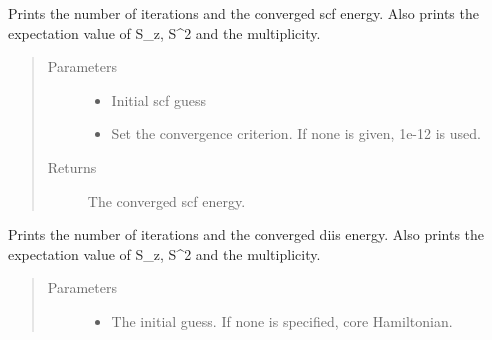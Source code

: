 \documentclass[letterpaper,10pt,english]{sphinxmanual}
\begin{document}
\begin{fulllineitems}
\begin{fulllineitems}
\begin{quote}
\begin{description}
\end{description}\end{quote}

\end{fulllineitems}


\begin{fulllineitems}
\label{\detokenize{cUHF_b:hf.HartreeFock.cUHF_b.MF.get_scf_solution}}
Prints the number of iterations and the converged scf energy.
Also prints the expectation value of S\_z, S\textasciicircum{}2 and the multiplicity.
\begin{quote}\begin{description}
\item[{Parameters}] \leavevmode\begin{itemize}
\item {} 
 \textendash{} Initial scf guess

\item {} 
 \textendash{} Set the convergence criterion. If none is given, 1e-12 is used.

\end{itemize}

\item[{Returns}] \leavevmode
The converged scf energy.

\end{description}\end{quote}

\end{fulllineitems}


\begin{fulllineitems}
\label{\detokenize{cUHF_b:hf.HartreeFock.cUHF_b.MF.get_scf_solution_diis}}
Prints the number of iterations and the converged diis energy.
Also prints the expectation value of S\_z, S\textasciicircum{}2 and the multiplicity.
\begin{quote}\begin{description}
\item[{Parameters}] \leavevmode\begin{itemize}
\item {} 
 \textendash{} The initial guess. If none is specified, core Hamiltonian.


\end{itemize}
\end{description}
\end{quote}
\end{fulllineitems}
\end{fulllineitems}
\end{document}
